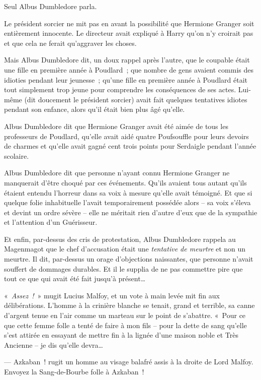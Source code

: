 Seul Albus Dumbledore parla.

Le président sorcier ne mit pas en avant la possibilité que Hermione Granger soit entièrement innocente. Le directeur avait expliqué à Harry qu'on n'y croirait pas et que cela ne ferait qu'aggraver les choses.

Mais Albus Dumbledore dit, un doux rappel après l'autre, que le coupable était une fille en première année à Poudlard~; que nombre de gens avaient commis des idioties pendant leur jeunesse~; qu'une fille en première année à Poudlard était tout simplement trop jeune pour comprendre les conséquences de ses actes. Lui-même (dit doucement le président sorcier) avait fait quelques tentatives idiotes pendant son enfance, alors qu'il était bien plus âgé qu'elle.

Albus Dumbledore dit que Hermione Granger avait été aimée de tous les professeurs de Poudlard, qu'elle avait aidé quatre Poufsouffle pour leurs devoirs de charmes et qu'elle avait gagné cent trois points pour Serdaigle pendant l'année scolaire.

Albus Dumbledore dit que personne n'ayant connu Hermione Granger ne manquerait d'être choqué par ces événements. Qu'ils avaient tous autant qu'ils étaient entendu l'horreur dans sa voix à mesure qu'elle avait témoigné. Et que si quelque folie inhabituelle l'avait temporairement possédée alors -- sa voix s'éleva et devint un ordre sévère -- elle ne méritait rien d'autre d'eux que de la sympathie et l'attention d'un Guérisseur.

Et enfin, par-dessus des cris de protestation, Albus Dumbledore rappela au Magenmagot que le chef d'accusation était une \emph{tentative de meurtre} et non un meurtre. Il dit, par-dessus un orage d'objections naissantes, que personne n'avait souffert de dommages durables. Et il le supplia de ne pas commettre pire que tout ce que qui avait été fait jusqu'à présent…

«~\emph{Assez~!}~» mugit Lucius Malfoy, et un vote à main levée mit fin aux délibérations. L'homme à la crinière blanche se tenait, grand et terrible, sa canne d'argent tenue en l'air comme un marteau sur le point de s'abattre. «~Pour ce que cette femme folle a tenté de faire à mon fils -- pour la dette de sang qu'elle s'est attirée en essayant de mettre fin à la lignée d'une maison noble et Très Ancienne -- je dis qu'elle devra…

--- Azkaban~! rugit un homme au visage balafré assis à la droite de Lord Malfoy. Envoyez la Sang-de-Bourbe folle à Azkaban~!

